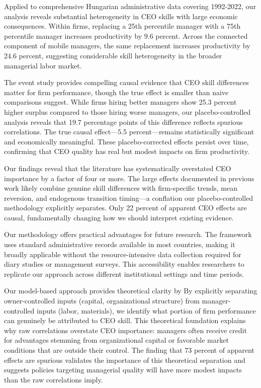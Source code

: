 \documentclass[11pt,a4paper]{article}
\begin{document}
Applied to comprehensive Hungarian administrative data covering 1992-2022, our analysis reveals substantial heterogeneity in CEO skills with large economic consequences. Within firms, replacing a 25th percentile manager with a 75th percentile manager increases productivity by 9.6 percent. Across the connected component of mobile managers, the same replacement increases productivity by 24.6 percent, suggesting considerable skill heterogeneity in the broader managerial labor market.

The event study provides compelling causal evidence that CEO skill differences matter for firm performance, though the true effect is smaller than naive comparisons suggest. While firms hiring better managers show 25.3 percent higher surplus compared to those hiring worse managers, our placebo-controlled analysis reveals that 19.7 percentage points of this difference reflects spurious correlations. The true causal effect---5.5 percent---remains statistically significant and economically meaningful. These placebo-corrected effects persist over time, confirming that CEO quality has real but modest impacts on firm productivity.

Our findings reveal that the literature has systematically overstated CEO importance by a factor of four or more. The large effects documented in previous work likely combine genuine skill differences with firm-specific trends, mean reversion, and endogenous transition timing---a conflation our placebo-controlled methodology explicitly separates. Only 22 percent of apparent CEO effects are causal, fundamentally changing how we should interpret existing evidence.

Our methodology offers practical advantages for future research. The framework uses standard administrative records available in most countries, making it broadly applicable without the resource-intensive data collection required for diary studies or management surveys. This accessibility enables researchers to replicate our approach across different institutional settings and time periods.

Our model-based approach provides theoretical clarity by By explicitly separating owner-controlled inputs (capital, organizational structure) from manager-controlled inputs (labor, materials), we identify what portion of firm performance can genuinely be attributed to CEO skill. This theoretical foundation explains why raw correlations overstate CEO importance: managers often receive credit for advantages stemming from organizational capital or favorable market conditions that are outside their control. The finding that 73 percent of apparent effects are spurious validates the importance of this theoretical separation and suggests policies targeting managerial quality will have more modest impacts than the raw correlations imply.
\end{document}
